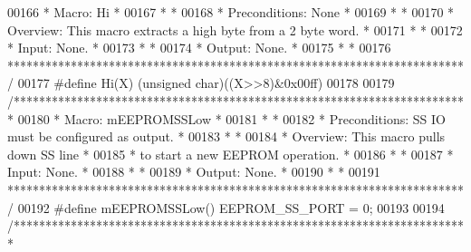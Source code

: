 \begin{DoxyCode}
00166 \textcolor{comment}{* Macro: Hi                                                             *}
00167 \textcolor{comment}{*                                                                       *}
00168 \textcolor{comment}{* Preconditions: None                                                   *}
00169 \textcolor{comment}{*                                                                       *}
00170 \textcolor{comment}{* Overview: This macro extracts a high byte from a 2 byte word.         *}
00171 \textcolor{comment}{*                                                                       *}
00172 \textcolor{comment}{* Input: None.                                                          *}
00173 \textcolor{comment}{*                                                                       *}
00174 \textcolor{comment}{* Output: None.                                                         *}
00175 \textcolor{comment}{*                                                                       *}
00176 \textcolor{comment}{************************************************************************/}
00177 \textcolor{preprocessor}{#define Hi(X)   (unsigned char)((X>>8)&0x00ff)}
00178 
00179 \textcolor{comment}{/************************************************************************}
00180 \textcolor{comment}{* Macro: mEEPROMSSLow                                                   *}
00181 \textcolor{comment}{*                                                                       *}
00182 \textcolor{comment}{* Preconditions: SS IO must be configured as output.                    *}
00183 \textcolor{comment}{*                                                                       *}
00184 \textcolor{comment}{* Overview: This macro pulls down SS line                               *}
00185 \textcolor{comment}{*           to start a new EEPROM operation.                            *}
00186 \textcolor{comment}{*                                                                       *}
00187 \textcolor{comment}{* Input: None.                                                          *}
00188 \textcolor{comment}{*                                                                       *}
00189 \textcolor{comment}{* Output: None.                                                         *}
00190 \textcolor{comment}{*                                                                       *}
00191 \textcolor{comment}{************************************************************************/}
00192 \textcolor{preprocessor}{#define mEEPROMSSLow()      EEPROM\_SS\_PORT = 0;}
00193 
00194 \textcolor{comment}{/************************************************************************}

\end{DoxyCode}
